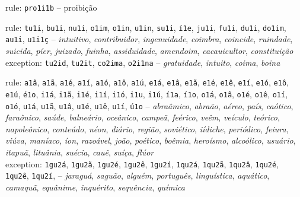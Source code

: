 \begin{rules}
\item\label{rulegrp_proi} rule: \texttt{pro1i1b} -- proibição

\item\label{rulegrp_Vi} rule: \texttt{tu1i}, \texttt{bu1i}, \texttt{nu1i}, \texttt{o1im}, \texttt{o1in}, \texttt{u1in}, \texttt{su1i}, \texttt{í1e}, \texttt{ju1i}, \texttt{fu1i}, \texttt{du1i}, \texttt{do1im}, \texttt{au1i}, \texttt{u1i1ç} -- \emph{intuitivo}, \emph{contribuidor}, \emph{ingenuidade}, \emph{coimbra}, \emph{coincide}, \emph{ruindade}, \emph{suicida}, \emph{píer}, \emph{juizado}, \emph{fuinha}, \emph{assiduidade}, \emph{amendoim}, \emph{cacauicultor}, \emph{constituição} \\
exception: \texttt{tu2id}, \texttt{tu2it}, \texttt{co2ima}, \texttt{o2i1na} -- \emph{gratuidade}, \emph{intuito}, \emph{coima}, \emph{boina}

\item\label{rulegrp_aa} rule: \texttt{a1â}, \texttt{a1ã}, \texttt{a1é}, \texttt{a1í}, \texttt{a1ó}, \texttt{a1ô}, \texttt{a1ú}, \texttt{e1á}, \texttt{e1â}, \texttt{e1ã}, \texttt{e1é}, \texttt{e1ê}, \texttt{e1í}, \texttt{e1ó}, \texttt{e1ô}, \texttt{e1ú}, \texttt{é1o}, \texttt{i1á}, \texttt{i1ã}, \texttt{i1é}, \texttt{i1í}, \texttt{i1ó}, \texttt{i1u}, \texttt{i1ú}, \texttt{í1a}, \texttt{í1o}, \texttt{o1á}, \texttt{o1ã}, \texttt{o1é}, \texttt{o1ê}, \texttt{o1í}, \texttt{o1ó}, \texttt{u1á}, \texttt{u1ã}, \texttt{u1â}, \texttt{u1é}, \texttt{u1ê}, \texttt{u1í}, \texttt{ú1o} --  \emph{abraâmico}, \emph{abraão}, \emph{aéreo}, \emph{país}, \emph{caótico}, \emph{faraônico}, \emph{saúde}, \emph{balneário}, \emph{oceânico}, \emph{campeã}, \emph{feérico}, \emph{veêm}, \emph{veículo}, \emph{teórico}, \emph{napoleônico}, \emph{conteúdo}, \emph{néon}, \emph{diário}, \emph{região}, \emph{soviético}, \emph{iídiche}, \emph{periódico}, \emph{feiura}, \emph{viúva}, \emph{maníaco}, \emph{íon}, \emph{razoável}, \emph{joão}, \emph{poético}, \emph{boêmia}, \emph{heroísmo}, \emph{alcoólico}, \emph{usuário}, \emph{itapuã}, \emph{lituânia}, \emph{suécia}, \emph{cauê}, \emph{suíça}, \emph{flúor} \\
exception: \texttt{1gu2á}, \texttt{1gu2ã}, \texttt{1gu2é}, \texttt{1gu2ê}, \texttt{1gu2í}, \texttt{1qu2á}, \texttt{1qu2ã}, \texttt{1qu2â}, \texttt{1qu2é}, \texttt{1qu2ê}, \texttt{1qu2í}, -- \emph{jaraguá}, \emph{saguão}, \emph{alguém}, \emph{português}, \emph{linguística}, \emph{aquático}, \emph{camaquã}, \emph{equânime}, \emph{inquérito}, \emph{sequência}, \emph{química} 


\end{rules}
